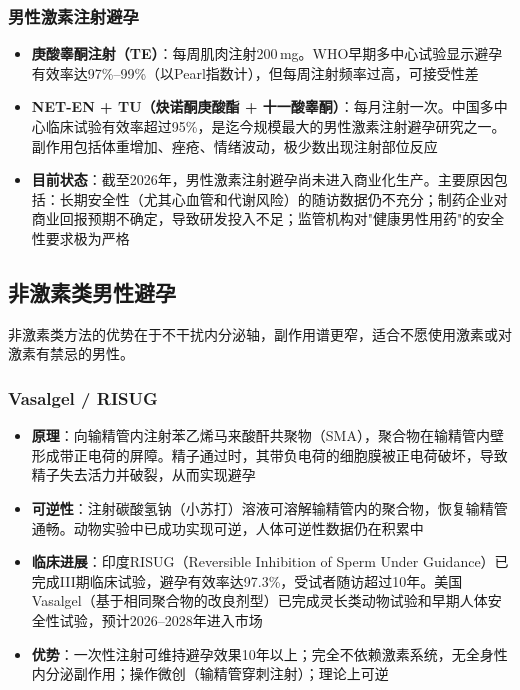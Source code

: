 \subsubsection{男性激素注射避孕}

\begin{itemize}[leftmargin=2cm]
	\item \textbf{庚酸睾酮注射（TE）}：每周肌肉注射200\,mg。WHO早期多中心试验显示避孕有效率达97\%--99\%（以Pearl指数计），但每周注射频率过高，可接受性差
	\item \textbf{NET-EN + TU（炔诺酮庚酸酯 + 十一酸睾酮）}：每月注射一次。中国多中心临床试验有效率超过95\%，是迄今规模最大的男性激素注射避孕研究之一。副作用包括体重增加、痤疮、情绪波动，极少数出现注射部位反应
	\item \textbf{目前状态}：截至2026年，男性激素注射避孕尚未进入商业化生产。主要原因包括：长期安全性（尤其心血管和代谢风险）的随访数据仍不充分；制药企业对商业回报预期不确定，导致研发投入不足；监管机构对"健康男性用药"的安全性要求极为严格
\end{itemize}

\subsection{非激素类男性避孕}

非激素类方法的优势在于不干扰内分泌轴，副作用谱更窄，适合不愿使用激素或对激素有禁忌的男性。

\subsubsection{Vasalgel / RISUG}

\begin{itemize}[leftmargin=2cm]
	\item \textbf{原理}：向输精管内注射苯乙烯马来酸酐共聚物（SMA），聚合物在输精管内壁形成带正电荷的屏障。精子通过时，其带负电荷的细胞膜被正电荷破坏，导致精子失去活力并破裂，从而实现避孕
	\item \textbf{可逆性}：注射碳酸氢钠（小苏打）溶液可溶解输精管内的聚合物，恢复输精管通畅。动物实验中已成功实现可逆，人体可逆性数据仍在积累中
	\item \textbf{临床进展}：印度RISUG（Reversible Inhibition of Sperm Under Guidance）已完成III期临床试验，避孕有效率达97.3\%，受试者随访超过10年。美国Vasalgel（基于相同聚合物的改良剂型）已完成灵长类动物试验和早期人体安全性试验，预计2026--2028年进入市场
	\item \textbf{优势}：一次性注射可维持避孕效果10年以上；完全不依赖激素系统，无全身性内分泌副作用；操作微创（输精管穿刺注射）；理论上可逆
\end{itemize}

